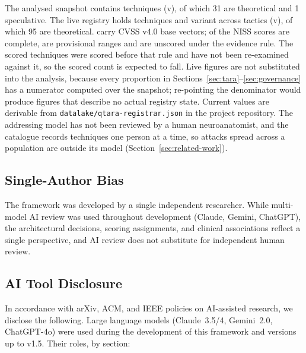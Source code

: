The analysed snapshot contains \SnapshotTechniques{} techniques (v\SnapshotRegistryVersion{}),
of which 31 are theoretical and 1 speculative. The live registry holds \LiveTechniques{}
techniques and \LiveVariants{} variant across \LiveTactics{} tactics
(v\LiveRegistryVersion{}), of which 95 are theoretical. \LiveWithCvss{} carry CVSS v4.0 base
vectors; of the NISS scores \LiveNissScored{} are complete, \LiveNissProvisional{} are
provisional ranges and \LiveNissUnscored{} are unscored under the evidence rule. The
\LiveNissScored{} scored techniques were scored before that rule and have not been
re-examined against it, so the scored count is expected to fall. Live figures are not
substituted into the analysis, because every proportion in
Sections~\ref{sec:tara}--\ref{sec:governance} has a numerator computed over the snapshot;
re-pointing the denominator would produce figures that describe no actual registry state.
Current values are derivable from \texttt{datalake/qtara-registrar.json} in the project
repository. The addressing model has not been reviewed by a human neuroanatomist, and the
catalogue records techniques one person at a time, so attacks spread across a population are
outside its model (Section~\ref{sec:related-work}).

\subsection{Single-Author Bias}

The framework was developed by a single independent researcher. While multi-model AI
review was used throughout development (Claude, Gemini, ChatGPT), the architectural
decisions, scoring assignments, and clinical associations reflect a single perspective, and
AI review does not substitute for independent human review.

\subsection{AI Tool Disclosure}

In accordance with arXiv, ACM, and IEEE policies on AI-assisted research, we
disclose the following. Large language models (Claude~3.5/4, Gemini~2.0, ChatGPT-4o)
were used during the development of this framework and versions up to v1.5. Their roles, by
section:

